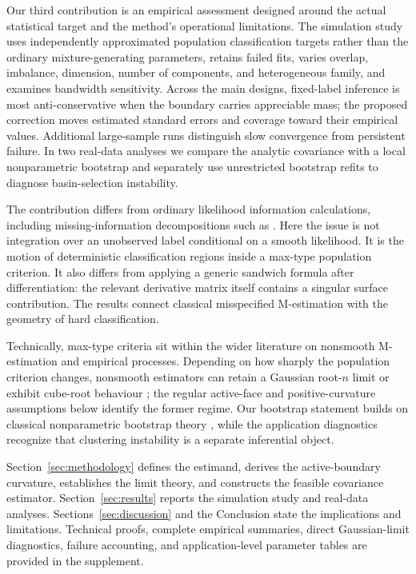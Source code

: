 \documentclass[12pt,a4paper]{article}
\theoremstyle{definition}
\theoremstyle{remark}
\begin{document}
Our third contribution is an empirical assessment designed around the actual
statistical target and the method's operational limitations.  The simulation
study uses independently approximated population classification targets rather
than the ordinary mixture-generating parameters, retains failed fits, varies
overlap, imbalance, dimension, number of components, and heterogeneous family,
and examines bandwidth sensitivity.  Across the main designs, fixed-label
inference is most anti-conservative when the boundary carries appreciable
mass; the proposed correction moves estimated standard errors and coverage
toward their empirical values.  Additional large-sample runs distinguish slow
convergence from persistent failure.  In two real-data analyses we compare the
analytic covariance with a local nonparametric bootstrap and separately use
unrestricted bootstrap refits to diagnose basin-selection instability.

The contribution differs from ordinary likelihood information calculations,
including missing-information decompositions such as \citet{Louis1982FindingTO}.
Here the issue is not integration over an unobserved label conditional on a
smooth likelihood.  It is the motion of deterministic classification regions
inside a max-type population criterion.  It also differs from applying a
generic sandwich formula after differentiation: the relevant derivative
matrix itself contains a singular surface contribution.  The results connect
classical misspecified M-estimation \citep{Huber1967,white1982maximum} with the
geometry of hard classification.

Technically, max-type criteria sit within the wider literature on nonsmooth
M-estimation and empirical processes. Depending on how sharply the population
criterion changes, nonsmooth estimators can retain a Gaussian root-$n$ limit
or exhibit cube-root behaviour \citep{kim1990cube,sherman1993limiting}; the
regular active-face and positive-curvature assumptions below identify the
former regime. Our bootstrap statement builds on classical nonparametric
bootstrap theory \citep{efron1979bootstrap,efron1993introduction}, while the
application diagnostics recognize that clustering instability is a separate
inferential object.

Section~\ref{sec:methodology} defines the estimand, derives the active-boundary
curvature, establishes the limit theory, and constructs the feasible
covariance estimator. Section~\ref{sec:results} reports the simulation study
and real-data analyses. Sections~\ref{sec:discussion} and the Conclusion state
the implications and limitations. Technical proofs, complete empirical
summaries, direct Gaussian-limit diagnostics, failure accounting, and
application-level parameter tables are provided in the supplement.
\end{document}
